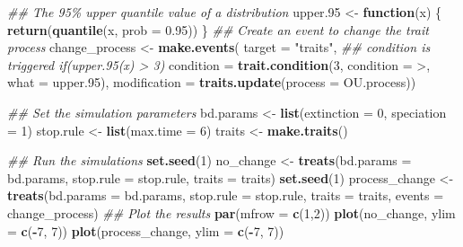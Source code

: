 \documentclass[
]{book}
\newenvironment{Shaded}{\begin{snugshade}}{\end{snugshade}}
\newcommand{\CommentTok}[1]{\textcolor[rgb]{0.56,0.35,0.01}{\textit{#1}}}
\newcommand{\ControlFlowTok}[1]{\textcolor[rgb]{0.13,0.29,0.53}{\textbf{#1}}}
\newcommand{\DataTypeTok}[1]{\textcolor[rgb]{0.13,0.29,0.53}{#1}}
\newcommand{\DecValTok}[1]{\textcolor[rgb]{0.00,0.00,0.81}{#1}}
\newcommand{\FloatTok}[1]{\textcolor[rgb]{0.00,0.00,0.81}{#1}}
\newcommand{\KeywordTok}[1]{\textcolor[rgb]{0.13,0.29,0.53}{\textbf{#1}}}
\newcommand{\NormalTok}[1]{#1}
\newcommand{\OperatorTok}[1]{\textcolor[rgb]{0.81,0.36,0.00}{\textbf{#1}}}
\newcommand{\StringTok}[1]{\textcolor[rgb]{0.31,0.60,0.02}{#1}}
\begin{document}
\begin{Shaded}
\begin{Highlighting}[]
\CommentTok{\#\# The 95\% upper quantile value of a distribution}
\NormalTok{upper}\FloatTok{.95}\NormalTok{ \textless{}{-}}\StringTok{ }\ControlFlowTok{function}\NormalTok{(x) \{}
    \KeywordTok{return}\NormalTok{(}\KeywordTok{quantile}\NormalTok{(x, }\DataTypeTok{prob =} \FloatTok{0.95}\NormalTok{))}
\NormalTok{\} }
\CommentTok{\#\# Create an event to change the trait process}
\NormalTok{change\_process \textless{}{-}}\StringTok{ }\KeywordTok{make.events}\NormalTok{(}
                  \DataTypeTok{target       =} \StringTok{"traits"}\NormalTok{,}
                  \CommentTok{\#\# condition is triggered if(upper.95(x) \textgreater{} 3)}
                  \DataTypeTok{condition    =} \KeywordTok{trait.condition}\NormalTok{(}\DecValTok{3}\NormalTok{, }\DataTypeTok{condition =} \StringTok{\textasciigrave{}}\DataTypeTok{\textgreater{}}\StringTok{\textasciigrave{}}\NormalTok{, }\DataTypeTok{what =}\NormalTok{ upper}\FloatTok{.95}\NormalTok{),}
                  \DataTypeTok{modification =} \KeywordTok{traits.update}\NormalTok{(}\DataTypeTok{process =}\NormalTok{ OU.process))}

\CommentTok{\#\# Set the simulation parameters}
\NormalTok{bd.params \textless{}{-}}\StringTok{ }\KeywordTok{list}\NormalTok{(}\DataTypeTok{extinction =} \DecValTok{0}\NormalTok{, }\DataTypeTok{speciation =} \DecValTok{1}\NormalTok{)}
\NormalTok{stop.rule \textless{}{-}}\StringTok{ }\KeywordTok{list}\NormalTok{(}\DataTypeTok{max.time =} \DecValTok{6}\NormalTok{)}
\NormalTok{traits    \textless{}{-}}\StringTok{ }\KeywordTok{make.traits}\NormalTok{()}

\CommentTok{\#\# Run the simulations}
\KeywordTok{set.seed}\NormalTok{(}\DecValTok{1}\NormalTok{)}
\NormalTok{no\_change \textless{}{-}}\StringTok{ }\KeywordTok{treats}\NormalTok{(}\DataTypeTok{bd.params =}\NormalTok{ bd.params,}
                    \DataTypeTok{stop.rule =}\NormalTok{ stop.rule,}
                    \DataTypeTok{traits =}\NormalTok{ traits)}
\KeywordTok{set.seed}\NormalTok{(}\DecValTok{1}\NormalTok{)}
\NormalTok{process\_change \textless{}{-}}\StringTok{ }\KeywordTok{treats}\NormalTok{(}\DataTypeTok{bd.params =}\NormalTok{ bd.params,}
                         \DataTypeTok{stop.rule =}\NormalTok{ stop.rule,}
                         \DataTypeTok{traits    =}\NormalTok{ traits,}
                         \DataTypeTok{events    =}\NormalTok{ change\_process)}
\CommentTok{\#\# Plot the results}
\KeywordTok{par}\NormalTok{(}\DataTypeTok{mfrow =} \KeywordTok{c}\NormalTok{(}\DecValTok{1}\NormalTok{,}\DecValTok{2}\NormalTok{))}
\KeywordTok{plot}\NormalTok{(no\_change, }\DataTypeTok{ylim =} \KeywordTok{c}\NormalTok{(}\OperatorTok{{-}}\DecValTok{7}\NormalTok{, }\DecValTok{7}\NormalTok{))}
\KeywordTok{plot}\NormalTok{(process\_change, }\DataTypeTok{ylim =} \KeywordTok{c}\NormalTok{(}\OperatorTok{{-}}\DecValTok{7}\NormalTok{, }\DecValTok{7}\NormalTok{))}
\end{Highlighting}
\end{Shaded}
\end{document}
